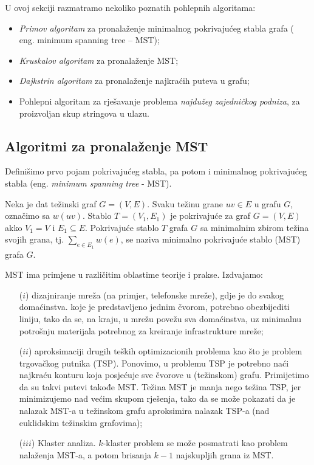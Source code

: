 \documentclass[a4paper, utf8, 11pt, colorlinks]{book}
\theoremstyle{definition}
\begin{document}
U ovoj sekciji razmatramo nekoliko poznatih pohlepnih algoritama:
\begin{itemize}
	\item  \emph{Primov algoritam} za pronalaženje minimalnog pokrivajućeg stabla grafa ( eng. minimum spanning tree -- MST);
	\item  \emph{Kruskalov algoritam} za pronalaženje MST;
	\item  \emph{Dajkstrin algoritam} za pronalaženje najkraćih puteva u grafu;
	\item  Pohlepni algoritam za rješavanje problema \emph{najdužeg zajedničkog podniza}, za proizvoljan skup stringova u ulazu.
\end{itemize}


\subsection{Algoritmi za pronalaženje MST}

Definišimo prvo pojam pokrivajućeg stabla, pa potom i minimalnog pokrivajućeg stabla (eng. \emph{minimum spanning tree} - MST).

Neka je dat težinski graf $G=(V,E)$. Svaku težinu grane $uv \in E $ u grafu $G$, označimo sa $w(uv)$. 
  Stablo $T =(V_1, E_1)$ je pokrivajuće za graf $G=(V,E)$ akko
  $V_1 = V$ i $E_1 \subseteq E$. Pokrivajuće stablo $T$ grafa $G$ sa minimalnim zbirom težina svojih grana, tj. 
  $\sum_{e \in E_1} w(e)$, se naziva minimalno pokrivajuće stablo (MST) grafa $G$. 

MST ima primjene u različitim oblastime teorije i prakse. Izdvajamo:
\begin{enumerate}
 \item[($i$)] dizajniranje mreža (na primjer, telefonske mreže), gdje je do svakog domaćinstva. koje je predstavljeno jednim čvorom, potrebno obezbijediti liniju, tako da se, na kraju, u mrežu povežu sva domaćinstva, uz minimalnu potrošnju materijala potrebnog za kreiranje infrastrukture mreže;
 \item[($ii$)] aproksimaciji drugih teških optimizacionih problema kao što je problem trgovačkog putnika (TSP). Ponovimo, u problemu TSP je potrebno naći najkraću konturu koja posjećuje sve čvorove u (težinskom) grafu. Primijetimo da su takvi putevi takođe MST. Težina MST je manja nego težina TSP, jer minimizujemo nad većim skupom rješenja, tako da se može pokazati da je nalazak MST-a u težinskom grafu aproksimira nalazak TSP-a (nad euklidskim težinskim grafovima); 
 \item[($iii$)] Klaster analiza. $k$-klaster problem  se može posmatrati kao problem nalaženja MST-a, a potom brisanja $k-1$ najskupljih grana iz MST. 
 \end{enumerate}
\end{document}
